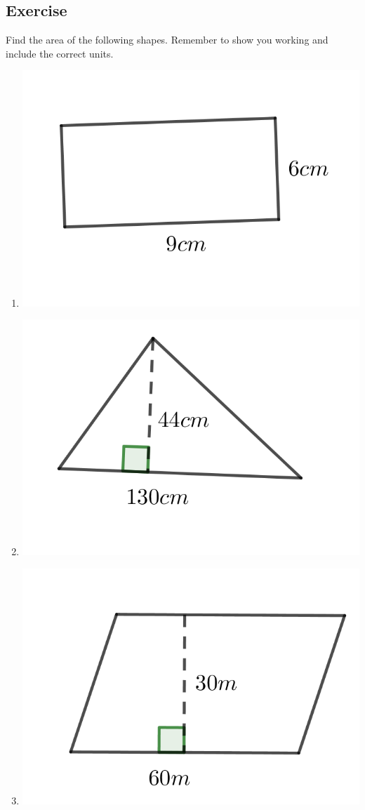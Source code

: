 \subsection{Exercise}
Find the area of the following shapes.  Remember to show you working and include the correct units.
\begin{multicols}{2}
\begin{enumerate}
	\item \includegraphics{./Images/Measurement/AreaQu1.png}
	\item \includegraphics{./Images/Measurement/AreaQu2.png}
	\item \includegraphics{./Images/Measurement/AreaQu3.png}

\end{enumerate}
\end{multicols}
